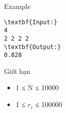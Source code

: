 Example  
\begin{verbatim}
\textbf{Input:}
4
2 2 2 2
\textbf{Output:}
0.828
\end{verbatim}
   Giới hạn  
\begin{itemize}
	\item     1 ≤ N ≤ 10000   
	\item     1 ≤ $r_{i}$    ≤ 100000   
\end{itemize}